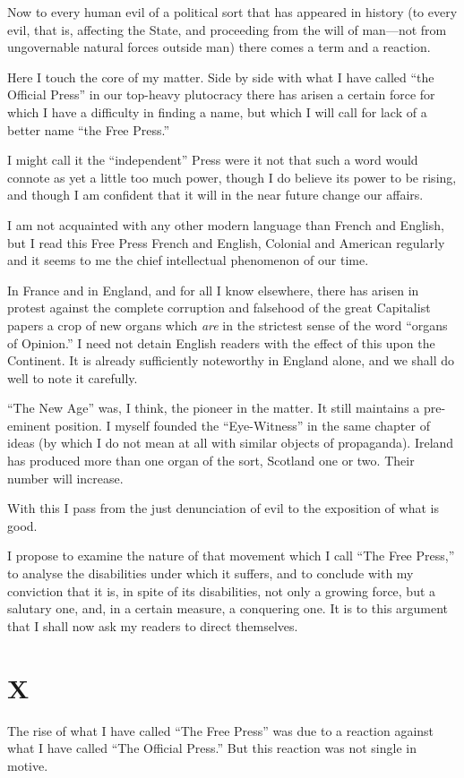 \documentclass{book}
\begin{document}
Now to every human evil of a political sort that has appeared in history (to every evil, that is, affecting the State, and proceeding from the will of man—not from ungovernable natural forces outside man) there comes a term and a reaction.

Here I touch the core of my matter. Side by side with what I have called “the Official Press” in our top-heavy plutocracy there has arisen a certain force for which I have a difficulty in finding a name, but which I will call for lack of a better name “the Free Press.”

I might call it the “independent” Press were it not that such a word would connote as yet a little too much power, though I do believe its power to be rising, and though I am confident that it will in the near future change our affairs.

I am not acquainted with any other modern language than French and English, but I read this Free Press French and English, Colonial and American regularly and it seems to me the chief intellectual phenomenon of our time.

In France and in England, and for all I know elsewhere, there has arisen in protest against the complete corruption and falsehood of the great Capitalist papers a crop of new organs which \emph{are} in the strictest sense of the word “organs of Opinion.” I need not detain English readers with the effect of this upon the Continent. It is already sufficiently noteworthy in England alone, and we shall do well to note it carefully.

“The New Age” was, I think, the pioneer in the matter. It still maintains a pre-eminent position. I myself founded the “Eye-Witness” in the same chapter of ideas (by which I do not mean at all with similar objects of propaganda). Ireland has produced more than one organ of the sort, Scotland one or two. Their number will increase.

With this I pass from the just denunciation of evil to the exposition of what is good.

I propose to examine the nature of that movement which I call “The Free Press,” to analyse the disabilities under which it suffers, and to conclude with my conviction that it is, in spite of its disabilities, not only a growing force, but a salutary one, and, in a certain measure, a conquering one. It is to this argument that I shall now ask my readers to direct themselves.

\chapter*{X}
\label{chapter-11}
The rise of what I have called “The Free Press” was due to a reaction against what I have called “The Official Press.” But this reaction was not single in motive.
\end{document}
